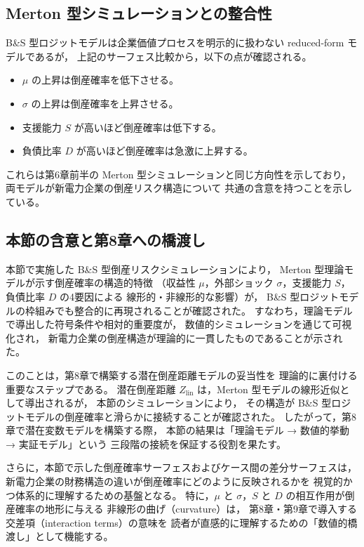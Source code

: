\subsection{Merton 型シミュレーションとの整合性}

B\&S 型ロジットモデルは企業価値プロセスを明示的に扱わない reduced-form モデルであるが，
上記のサーフェス比較から，以下の点が確認される。

\begin{itemize}
    \item $\mu$ の上昇は倒産確率を低下させる。
    \item $\sigma$ の上昇は倒産確率を上昇させる。
    \item 支援能力 $S$ が高いほど倒産確率は低下する。
    \item 負債比率 $D$ が高いほど倒産確率は急激に上昇する。
\end{itemize}

これらは第6章前半の Merton 型シミュレーションと同じ方向性を示しており，
両モデルが新電力企業の倒産リスク構造について
共通の含意を持つことを示している。

\subsection{本節の含意と第8章への橋渡し}

本節で実施した B\&S 型倒産リスクシミュレーションにより，
Merton 型理論モデルが示す倒産確率の構造的特徴
（収益性 $\mu$，外部ショック $\sigma$，支援能力 $S$，負債比率 $D$ の4要因による
線形的・非線形的な影響）が，
B\&S 型ロジットモデルの枠組みでも整合的に再現されることが確認された。
すなわち，理論モデルで導出した符号条件や相対的重要度が，
数値的シミュレーションを通じて可視化され，
新電力企業の倒産構造が理論的に一貫したものであることが示された。

このことは，第8章で構築する潜在倒産距離モデルの妥当性を
理論的に裏付ける重要なステップである。
潜在倒産距離 $Z_{\text{lin}}$ は，Merton 型モデルの線形近似として導出されるが，
本節のシミュレーションにより，
その構造が B\&S 型ロジットモデルの倒産確率と滑らかに接続することが確認された。
したがって，第8章で潜在変数モデルを構築する際，
本節の結果は「理論モデル → 数値的挙動 → 実証モデル」という
三段階の接続を保証する役割を果たす。

さらに，本節で示した倒産確率サーフェスおよびケース間の差分サーフェスは，
新電力企業の財務構造の違いが倒産確率にどのように反映されるかを
視覚的かつ体系的に理解するための基盤となる。
特に，$\mu$ と $\sigma$，$S$ と $D$ の相互作用が倒産確率の地形に与える
非線形の曲げ（curvature）は，
第8章・第9章で導入する交差項（interaction terms）の意味を
読者が直感的に理解するための「数値的橋渡し」として機能する。


